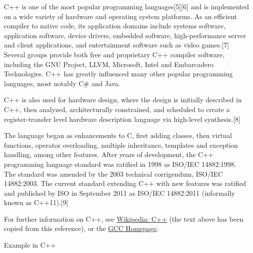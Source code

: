 \vpara
C++ is one of the most popular programming languages[5][6] and is implemented on a wide variety of hardware and operating system platforms. As an efficient compiler to native code, its application domains include systems software, application software, device drivers, embedded software, high-performance server and client applications, and entertainment software such as video games.[7] Several groups provide both free and proprietary C++ compiler software, including the GNU Project, LLVM, Microsoft, Intel and Embarcadero Technologies. C++ has greatly influenced many other popular programming languages, most notably C\# and Java.

\vpara
C++ is also used for hardware design, where the design is initially described in C++, then analyzed, architecturally constrained, and scheduled to create a register-transfer level hardware description language via high-level synthesis.[8]

\vpara
The language began as enhancements to C, first adding classes, then virtual functions, operator overloading, multiple inheritance, templates and exception handling, among other features. After years of development, the C++ programming language standard was ratified in 1998 as ISO/IEC 14882:1998. The standard was amended by the 2003 technical corrigendum, ISO/IEC 14882:2003. The current standard extending C++ with new features was ratified and published by ISO in September 2011 as ISO/IEC 14882:2011 (informally known as C++11).[9]

\vpara
For further information on C++, see \href{http://en.wikipedia.org/wiki/C\%2B\%2B}{Wikipedia: C++} (the text above has been copied from this reference), or the  \href{http://gcc.gnu.org/}{GCC Homepage}.


\vpara
Example in C++


